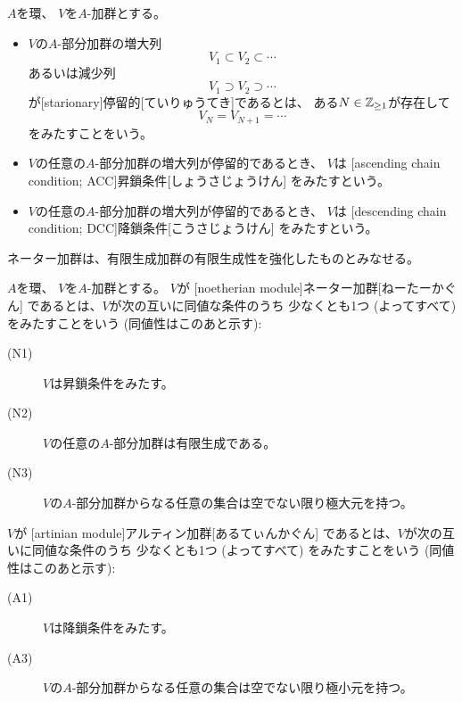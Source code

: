 \documentclass[report]{jlreq}
\begin{document}
\begin{definition}[昇鎖条件と降鎖条件]
    $A$を環、
    $V$を$A$-加群とする。
    \begin{itemize}
        \item $V$の$A$-部分加群の増大列
            \begin{equation}
                V_1 \subset V_2 \subset \cdots
            \end{equation}
            あるいは減少列
            \begin{equation}
                V_1 \supset V_2 \supset \cdots
            \end{equation}
            が[starionary]{停留的}[ていりゅうてき]であるとは、
            ある$N \in \mathbb{Z}_{\ge 1}$が存在して
            \begin{equation}
                V_N = V_{N + 1} = \cdots
            \end{equation}
            をみたすことをいう。
        \item $V$の任意の$A$-部分加群の増大列が停留的であるとき、
            $V$は
            [ascending chain condition; ACC]{昇鎖条件}[しょうさじょうけん]
            をみたすという。
        \item $V$の任意の$A$-部分加群の増大列が停留的であるとき、
            $V$は
            [descending chain condition; DCC]{降鎖条件}[こうさじょうけん]
            をみたすという。
    \end{itemize}
\end{definition}

ネーター加群は、有限生成加群の有限生成性を強化したものとみなせる。


\begin{definition}[ネーター加群とアルティン加群]
    $A$を環、
    $V$を$A$-加群とする。
    $V$が
    [noetherian module]{ネーター加群}[ねーたーかぐん]
    であるとは、$V$が次の互いに同値な条件のうち
    少なくとも1つ (よってすべて) をみたすことをいう (同値性はこのあと示す):
    \begin{description}
        \item[(N1)] $V$は昇鎖条件をみたす。
        \item[(N2)] $V$の任意の$A$-部分加群は有限生成である。
        \item[(N3)] $V$の$A$-部分加群からなる任意の集合は空でない限り極大元を持つ。
    \end{description}

    $V$が
    [artinian module]{アルティン加群}[あるてぃんかぐん]
    であるとは、$V$が次の互いに同値な条件のうち
    少なくとも1つ (よってすべて) をみたすことをいう (同値性はこのあと示す):
    \begin{description}
        \item[(A1)] $V$は降鎖条件をみたす。
        \item[(A3)] $V$の$A$-部分加群からなる任意の集合は空でない限り極小元を持つ。
    \end{description}
\end{definition}
\end{document}
